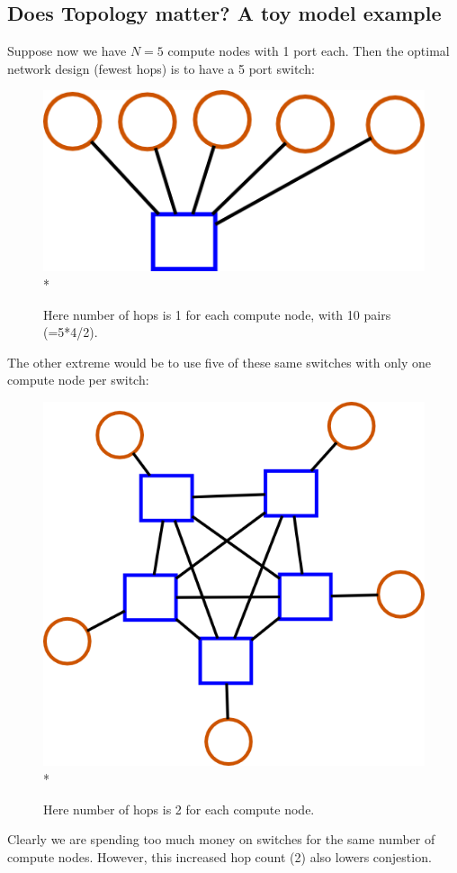 \documentclass[pdftex]{article}
\begin{document}
\subsection{Does Topology matter? A toy model example}

Suppose now we have $N=5$ compute nodes with 1 port each. Then the optimal network design (fewest hops) is to have a 5 port switch:
\begin{figure}[h!]
\begin{center}
\includegraphics[scale=0.2]{pictures/N5_n1_M1_m5.png}\\*
\caption{Here number of hops is 1 for each compute node, with 10 pairs (=5*4/2).}
\end{center}
\end{figure}

The other extreme would be to use five of these same switches with only one compute node per switch:
\begin{figure}[h!]
\begin{center}
\includegraphics[scale=0.2]{pictures/N5_n1_M5_m5.png}\\*
\caption{Here number of hops is 2 for each compute node.}
\end{center}
\end{figure}
Clearly we are spending too much money on switches for the same number of compute nodes. However, this increased hop count (2) also lowers conjestion.
\end{document}

